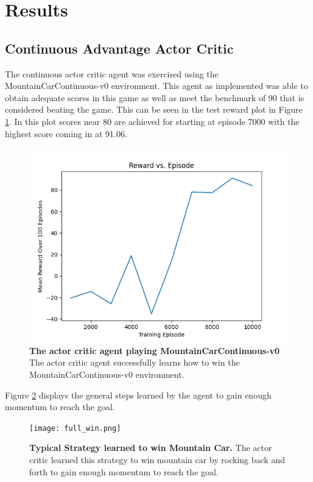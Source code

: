 \documentclass[conference]{IEEEtran}
\begin{document}
\section{Results} \label{results}

\subsection{Continuous Advantage Actor Critic}
The continuous actor critic agent was exercised using the MountainCarContinuous-v0 environment.
This agent as implemented was able to obtain adequate scores in this game as well as meet the benchmark of 90 that is considered beating the game.
This can be seen in the test reward plot in Figure \ref{fig:actorCriticGoodTestRewardMcc}.
In this plot scores near 80 are achieved for starting at episode 7000 with the highest score coming in at 91.06.

\begin{figure}[htbp]
\centerline{\includegraphics[scale=0.5]{best_actor_critic_mcc_test.png}}
\caption{\textbf{The actor critic agent playing MountainCarContinuous-v0}  The actor critic agent successfully learns how to win the MountainCarContinuous-v0 environment.}
\label{fig:actorCriticGoodTestRewardMcc}
\end{figure}

Figure \ref{fig:fullWinA2CMountainCar} displays the general steps learned by the agent to gain enough momentum to reach the goal.

\begin{figure}[htbp]
\centerline{\texttt{[image: full\_win.png]}}
\caption{\textbf{Typical Strategy learned to win Mountain Car.}  The actor critic learned this strategy to win mountain car by rocking  back and forth to gain enough momentum to reach the goal.}
\label{fig:fullWinA2CMountainCar}
\end{figure}
\end{document}
